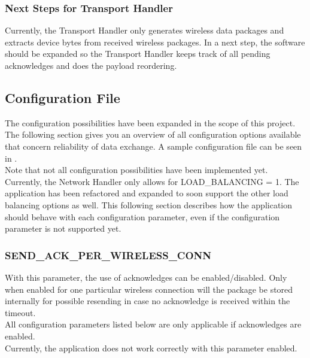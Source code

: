\subsubsection{Next Steps for Transport Handler}
Currently, the Transport Handler only generates wireless data packages and extracts device bytes from received wireless packages. In a next step, the software should be expanded so the Transport Handler keeps track of all pending acknowledges and does the payload reordering.
%
\subsection{Configuration File} \label{subsec:txtNewConfigOptions}
The configuration possibilities have been expanded in the scope of this project. The following section gives you an overview of all configuration options available that concern reliability of data exchange. A sample configuration file can be seen in .\\
Note that not all configuration possibilities have been implemented yet. Currently, the Network Handler only allows for LOAD\_BALANCING = 1. The application has been refactored and expanded to soon support the other load balancing options as well. This following section describes how the application should behave with each configuration parameter, even if the configuration parameter is not supported yet.
%
\subsubsection{SEND\_ACK\_PER\_WIRELESS\_CONN}
With this parameter, the use of acknowledges can be enabled/disabled. Only when enabled for one particular wireless connection will the package be stored internally for possible resending in case no acknowledge is received within the timeout.\\
All configuration parameters listed below are only applicable if acknowledges are enabled.\\
Currently, the application does not work correctly with this parameter enabled.
%
